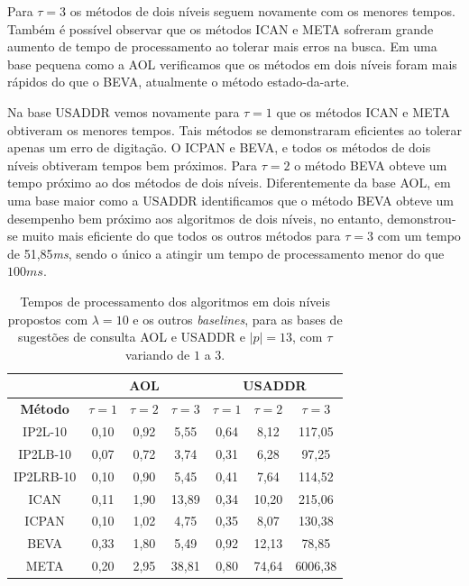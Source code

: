 Para $\tau=3$ os métodos de dois níveis seguem novamente com os menores tempos. Também é possível observar que os métodos ICAN e META sofreram grande aumento de tempo de processamento ao tolerar mais erros na busca. Em uma base pequena como a AOL verificamos que os métodos em dois níveis foram mais rápidos do que o BEVA, atualmente o método estado-da-arte.

Na base USADDR vemos novamente para $\tau=1$ que os métodos ICAN e META obtiveram os menores tempos. Tais métodos se demonstraram eficientes ao tolerar apenas um erro de digitação. O ICPAN e BEVA, e todos os métodos de dois níveis obtiveram tempos bem próximos. Para $\tau=2$ o método BEVA obteve um tempo próximo ao dos métodos de dois níveis. Diferentemente da base AOL, em uma base maior como a USADDR identificamos que o método BEVA obteve um desempenho bem próximo aos algoritmos de dois níveis, no entanto, demonstrou-se muito mais eficiente do que todos os outros métodos para $\tau=3$ com um tempo de 51,85\textit{ms}, sendo o único a atingir um tempo de processamento menor do que $100ms$. 

\begin{table}[h]
\centering
\begin{tabular}{c|c|c|c|c|c|c|}
\cline{2-7}
 & \multicolumn{3}{c|}{\textbf{AOL}} & \multicolumn{3}{c|}{\textbf{USADDR}} \\ \hline
\multicolumn{1}{|c|}{\textbf{Método}} & $\tau=1$ & $\tau=2$ & $\tau=3$ & $\tau=1$ & $\tau=2$ & $\tau=3$ \\ \hline
\multicolumn{1}{|c|}{IP2L-10} & 0,10 & 0,92 & 5,55 & 0,64 & 8,12 & 117,05 \\ \hline
\multicolumn{1}{|c|}{IP2LB-10} & 0,07 & 0,72 & 3,74 & 0,31 & 6,28 & 97,25 \\ \hline
\multicolumn{1}{|c|}{IP2LRB-10} & 0,10 & 0,90 & 5,45 & 0,41 & 7,64 & 114,52 \\ \hline
\multicolumn{1}{|c|}{ICAN} & 0,11 & 1,90 & 13,89 & 0,34 & 10,20 & 215,06 \\ \hline
\multicolumn{1}{|c|}{ICPAN} & 0,10 & 1,02 & 4,75 & 0,35 & 8,07 & 130,38 \\ \hline
\multicolumn{1}{|c|}{BEVA} & 0,33 & 1,80 & 5,49 & 0,92 & 12,13 & 78,85 \\ \hline
\multicolumn{1}{|c|}{META} & 0,20 & 2,95 & 38,81 & 0,80 & 74,64 & 6006,38 \\ \hline
\end{tabular}
\caption{Tempos de processamento dos algoritmos em dois níveis propostos com $\lambda=10$ e os outros \textit{baselines}, para as bases de sugestões de consulta AOL e USADDR e $|p|=13$, com $\tau$ variando de $1$ a $3$.}
\label{tab:baselines-varying-tau-p-13}
\end{table}

